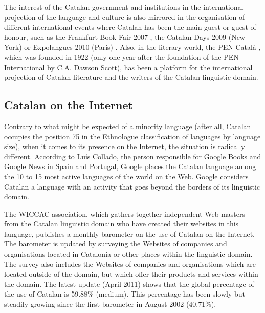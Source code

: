 \begin{multicols}{2}

The interest of the Catalan government and institutions in the international projection of the language and culture is also mirrored in the organisation of different international events where Catalan has been the main guest or guest of honour, such as the Frankfurt Book Fair 2007 \cite{CAT-Nota13}, the Catalan Days 2009 (New York) \cite{CAT-Nota14} or Expolangues 2010 (Paris) \cite{CAT-Nota15}. Also, in the literary world, the PEN Català \cite{CAT-Nota16}, which was founded in 1922 (only one year after the foundation of the PEN International by C.A. Dawson Scott), has been a platform for the international projection of Catalan literature and the writers of the Catalan linguistic domain.

\subsection{Catalan on the Internet}

Contrary to what might be expected of a minority language (after all, Catalan occupies the position 75 in the Ethnologue \cite{CAT-Nota17} classification of languages by language size), when it comes to its presence on the Internet, the situation is radically different. According to Luís Collado, the person responsible for Google Books and Google News in Spain and Portugal, Google places the Catalan language among the 10 to 15 most active languages of the world on the Web. Google considers Catalan a language with an activity that goes beyond the borders of its linguistic domain.


The WICCAC \cite{CAT-Nota18} association, which gathers together independent Web-masters from the Catalan linguistic domain who have created their websites in this language, publishes a monthly barometer on the use of Catalan on the Internet. The barometer is updated by surveying the Websites of companies and organisations located in Catalonia or other places within the linguistic domain. The survey also includes the Websites of companies and organisations which are located outside of the domain, but which offer their products and services within the domain. The latest update (April 2011) shows that the global percentage of the use of Catalan is 59.88\% (medium). This percentage has been slowly but steadily growing since the first barometer in August 2002 (40.71\%).


\end{multicols}
